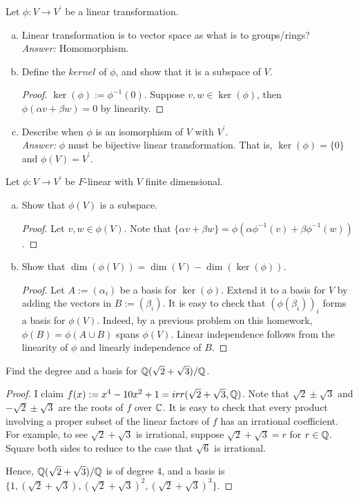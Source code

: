 \documentclass{article}
\begin{document}
 Let $\phi: V \to V^\prime$ be a linear transformation.
\begin{enumerate}[a.]
\item Linear transformation is to vector space as what is to groups/rings?
\\\emph{Answer:} Homomorphism. 
\item Define the $kernel$ of $\phi$, and show that it is a subspace of $V$.
\begin{proof}
$\ker(\phi):= \phi^{-1}(0)$. Suppose $v,w \in \ker(\phi)$, then $\phi(\alpha v + \beta w) = 0$ by linearity. 
\end{proof}
\item Describe when $\phi$ is an isomorphism of $V$ with $V^\prime$.
\\\emph{Answer:} $\phi$ must be bijective linear transformation. That is, $\ker(\phi) = \{0\}$ and $\phi(V) = V^\prime$.
\end{enumerate}
 Let $\phi: V\to V^\prime$ be $F$-linear with $V$ finite dimensional.
\begin{enumerate}[a.]
\item Show that $\phi(V)$ is a subspace.
\begin{proof}
Let $v,w \in \phi(V)$. Note that $\{\alpha v + \beta w\} = \phi(\alpha \phi^{-1}(v) + \beta \phi^{-1}(w))$.
\end{proof}
\item Show that $\dim(\phi(V)) = \dim(V) - \dim(\ker(\phi))$.
\begin{proof}
Let $A := (\alpha_i)$ be a basis for $\ker(\phi)$. Extend it to a basis for $V$ by adding the vectors in $B := (\beta_i)$. It is easy to check that $(\phi(\beta_i))_i$ forms a basis for $\phi(V)$. Indeed, by a previous problem on this homework, $\phi(B) = \phi(A \cup B)$ spans $\phi(V)$. Linear independence follows from the linearity of $\phi$ and linearly independence of $B$.
\end{proof}
\end{enumerate}
 Find the degree and a basis for $\mathbb{Q}(\sqrt{2} + \sqrt{3}) / \mathbb{Q}$.
\begin{proof}
I claim $f(x) := x^4 -10x^2 +1 = irr(\sqrt 2 + \sqrt 3, \mathbb{Q})$. Note that $\sqrt 2\pm \sqrt 3$ and $-\sqrt 2 \pm \sqrt 3$ are the roots of $f$ over $\mathbb{C}$. It is easy to check that every product involving a proper subset of the linear factors of $f$ has an irrational coefficient. For example, to see $\sqrt{2} + \sqrt 3$ is irrational, suppose $\sqrt 2 + \sqrt 3 = r$ for $r\in \mathbb{Q}$. Square both sides to reduce to the case that $\sqrt 6$ is irrational.

Hence, $\mathbb{Q}(\sqrt{2} + \sqrt{3}) / \mathbb{Q}$ is of degree 4, and a basis is $\{1, (\sqrt{2} + \sqrt{3}), (\sqrt{2} + \sqrt{3})^2, (\sqrt{2} + \sqrt{3})^3\}$.
\end{proof}
\end{document}
